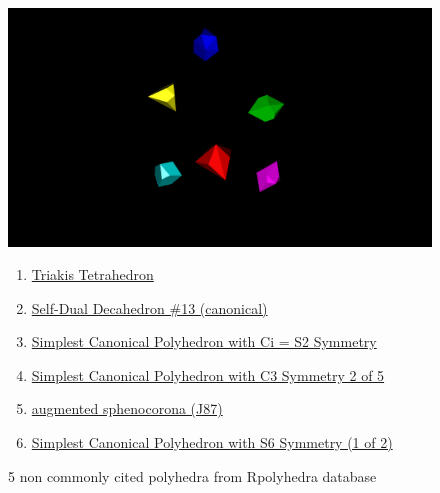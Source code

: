 \documentclass[a4paper,10pt]{article}
\begin{document}
\begin{figure}
 \begin{center}
    \includegraphics[width=15cm]{images/rpolyhedra_ic18_workshop.png}
 \end{center}
\caption{5 non commonly cited polyhedra from Rpolyhedra database}
\begin{enumerate}
\item \href{https://qbotics.shinyapps.io/rpolyhedra-explorer/?%
}{Triakis Tetrahedron}

\item \href{https://qbotics.shinyapps.io/rpolyhedra-explorer/?_inputs_&polyhedron_color=%
}{Self-Dual Decahedron \#13 (canonical)}
\item \href{https://qbotics.shinyapps.io/rpolyhedra-explorer/?_inputs_&polyhedron_color=%
}{Simplest Canonical Polyhedron with Ci = S2 Symmetry}




\item \href{
https://qbotics.shinyapps.io/rpolyhedra-explorer/?_inputs_&polyhedron_color=%
}{Simplest Canonical Polyhedron with C3 Symmetry 2 of 5}
\item \href{
https://qbotics.shinyapps.io/rpolyhedra-explorer/?_inputs_&polyhedron_color=%
\item \href{
https://qbotics.shinyapps.io/rpolyhedra-explorer/?_inputs_&polyhedron_color=%
}{Simplest Canonical Polyhedron with S6 Symmetry (1 of 2)}
\end{enumerate}
\end{figure}
\end{document}
